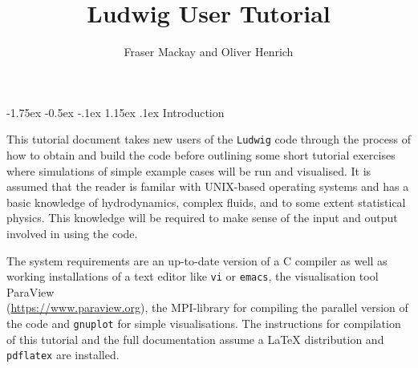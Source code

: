 \documentclass[11pt,twoside,a4paper]{article}
\begin{document}
\lstset{style=terminalverbatim}

\setcounter{page}{1}


\makeatletter
\renewcommand*{\section}{%
\@startsection {section}{1}{\z@}%
  {-1.75ex \@plus -0.5ex \@minus -.1ex}%
  {1.15ex \@plus.1ex}%
  {\normalfont\Large\bfseries}%
}
\renewcommand*{\subsection}{%
\@startsection {subsection}{2}{\z@}%
  {-1.75ex \@plus -0.5ex \@minus -.1ex}%
  {1.15ex \@plus.1ex}%
  {\normalfont\large\bfseries}%
}
\renewcommand*{\subsubsection}{%
\@startsection {subsubsection}{1}{\z@}%
  {-1.75ex \@plus -0.5ex \@minus -.1ex}%
  {1.15ex \@plus.1ex}%
  {\normalfont\normalsize\bfseries}%
}

\title{Ludwig User Tutorial}
\author{Fraser Mackay and Oliver Henrich}
\maketitle 
\tableofcontents
\clearpage


\section{Introduction}

This tutorial document takes new users of the \texttt{Ludwig} code through the process of how to obtain 
and build the code before outlining some short tutorial exercises where simulations 
of simple example cases will be run and visualised.
It is assumed that the reader is familar with UNIX-based operating systems and has 
a basic knowledge of hydrodynamics, complex fluids, and to some extent statistical physics. 
This knowledge will be required to make sense of the input and output involved in using the code. 

The system requirements are an up-to-date version of a C compiler as well as working installations 
of a text editor like \texttt{vi} or \texttt{emacs}, the visualisation tool
ParaView \\
({\color{blue}\hyperref[ParaView]{https://www.paraview.org}}), the MPI-library 
for compiling the parallel version of the code and \texttt{gnuplot} for simple visualisations.
The instructions for compilation of this tutorial and the full documentation assume a LaTeX distribution
and \texttt{pdflatex} are installed.
\end{document}
